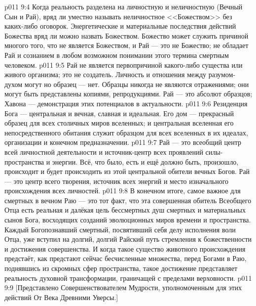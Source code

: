 \vs p011 9:4 Когда реальность разделена на личностную и неличностную (Вечный Сын и Рай), вряд ли уместно называть неличностное <<Божеством>> без каких\hyp{}либо оговорок. Энергетические и материальные последствия действий Божества вряд ли можно назвать Божеством. Божество может служить причиной многого того, что не является Божеством, и Рай --- это не Божество; не обладает Рай и сознанием в любом возможном понимании этого термина смертным человеком.
\vs p011 9:5 \pc Рай не является первопричиной какого\hyp{}либо существа или живого организма; это не создатель. Личность и отношения между разумом\hyp{}духом могут  но образец --- нет. Образцы никогда не являются отражениями; они могут быть представлены копиями, репродукциями. Рай --- это абсолют образцов; Хавона --- демонстрация этих потенциалов в актуальности.
\vs p011 9:6 \pc Резиденция Бога --- центральная и вечная, славная и идеальная. Его дом --- прекрасный образец для всех столичных миров вселенных; и центральная вселенная его непосредственного обитания служит образцом для всех вселенных в их идеалах, организации и конечном предназначении.
\vs p011 9:7 Рай --- это всеобщий центр всей личностной деятельности и источник\hyp{}центр всех проявлений силы\hyp{}пространства и энергии. Всё, что было, есть и ещё должно быть, произошло, происходит и будет происходить из этой центральной обители вечных Богов. Рай --- это центр всего творения, источник всех энергий и место изначального происхождения всех личностей.
\vs p011 9:8 \pc В конечном итоге, самое важное для смертных в вечном Раю --- это тот факт, что эта совершенная обитель Всеобщего Отца есть реальная и далёкая цель бессмертных душ смертных и материальных сынов Бога, восходящих созданий эволюционных миров времени и пространства. Каждый Богопознавший смертный, посвятивший себя делу исполнения воли Отца, уже вступил на долгий, долгий Райский путь стремления к божественности и достижения совершенства. И когда такое существо животного происхождения предстаёт, как предстают сейчас бесчисленные множества, перед Богами в Раю, поднявшись из скромных сфер пространства, такое достижение представляет реальность духовной трансформации, граничащей с пределами верховности.
\vsetoff
\vs p011 9:9 [Представлено Совершенствователем Мудрости, уполномоченным для этих действий От Века Древними Уверсы.]
\quizlink
